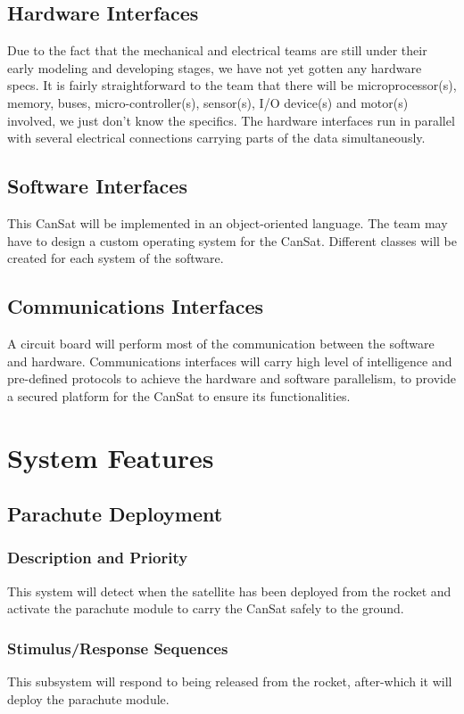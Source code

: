 \documentclass{scrreprt}
\begin{document}
\section{Hardware Interfaces}
Due to the fact that the mechanical and electrical teams are still under their early modeling and developing stages, we have not yet gotten any hardware specs. It is fairly straightforward to the team that there will be microprocessor(s), memory, buses, micro-controller(s), sensor(s), I/O device(s) and motor(s) involved, we just don't know the specifics. The hardware interfaces run in parallel with several electrical connections carrying parts of the data simultaneously.

\section{Software Interfaces}
This CanSat will be implemented in an object-oriented language. The team may have to design a custom operating system for the CanSat. Different classes will be created for each system of the software.

\section{Communications Interfaces}
A circuit board will perform most of the communication between the software and hardware. Communications interfaces will carry high level of intelligence and pre-defined protocols to achieve the hardware and software parallelism, to provide a secured platform for the CanSat to ensure its functionalities. 

\chapter{System Features}


\section{Parachute Deployment}


\subsection{Description and Priority}
This system will detect when the satellite has been deployed from the rocket and activate the parachute module to carry the CanSat safely to the ground.


\subsection{Stimulus/Response Sequences}
This  subsystem will respond to being released from the rocket, after-which it will deploy the parachute module.
\end{document}
